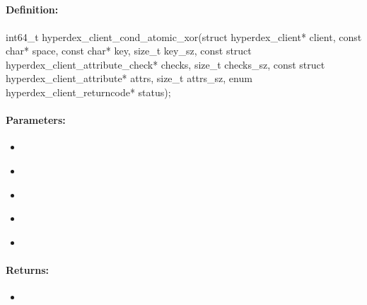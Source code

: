 \pagebreak
\subsection{}
\label{api:c:cond_atomic_xor}


\paragraph{Definition:}
\begin{ccode}
int64_t hyperdex_client_cond_atomic_xor(struct hyperdex_client* client,
        const char* space,
        const char* key, size_t key_sz,
        const struct hyperdex_client_attribute_check* checks, size_t checks_sz,
        const struct hyperdex_client_attribute* attrs, size_t attrs_sz,
        enum hyperdex_client_returncode* status);
\end{ccode}

\paragraph{Parameters:}
\begin{itemize}[noitemsep]
\item {}\\

\item {}\\

\item {}\\

\item {}\\

\item {}\\

\end{itemize}

\paragraph{Returns:}
\begin{itemize}[noitemsep]
\item {}\\

\end{itemize}

